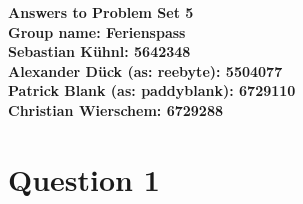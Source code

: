 \documentclass{article}
\begin{document}
\begin{center}
\LARGE \bfseries{Answers to Problem Set 5}\\
 Group name: Ferienspass\vspace{.5cm}\\
 \normalsize \normalfont
  Sebastian K\"uhnl: 5642348\\
  Alexander D\"uck (as: reebyte): 5504077\\
  Patrick Blank (as: paddyblank): 6729110\\
  Christian Wierschem: 6729288
\end{center}
\normalsize	
\section{Question 1}

%
\end{document}
